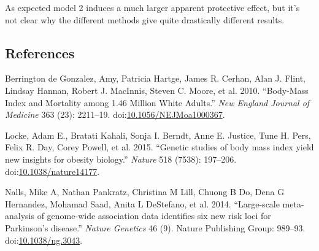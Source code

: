 \documentclass[]{article}
\begin{document}
As expected model 2 induces a much larger apparent protective effect,
but it's not clear why the different methods give quite drastically
different results.

\subsection*{References}\label{references}

{Berrington de Gonzalez}, Amy, Patricia Hartge, James R. Cerhan, Alan J.
Flint, Lindsay Hannan, Robert J. MacInnis, Steven C. Moore, et al. 2010.
``Body-Mass Index and Mortality among 1.46 Million White Adults.''
\emph{New England Journal of Medicine} 363 (23): 2211--19.
doi:\href{http://dx.doi.org/10.1056/NEJMoa1000367}{10.1056/NEJMoa1000367}.

Locke, Adam E., Bratati Kahali, Sonja I. Berndt, Anne E. Justice, Tune
H. Pers, Felix R. Day, Corey Powell, et al. 2015. ``Genetic studies of
body mass index yield new insights for obesity biology.'' \emph{Nature}
518 (7538): 197--206.
doi:\href{http://dx.doi.org/10.1038/nature14177}{10.1038/nature14177}.

Nalls, Mike A, Nathan Pankratz, Christina M Lill, Chuong B Do, Dena G
Hernandez, Mohamad Saad, Anita L DeStefano, et al. 2014. ``Large-scale
meta-analysis of genome-wide association data identifies six new risk
loci for Parkinson's disease.'' \emph{Nature Genetics} 46 (9). Nature
Publishing Group: 989--93.
doi:\href{http://dx.doi.org/10.1038/ng.3043}{10.1038/ng.3043}.
\end{document}
